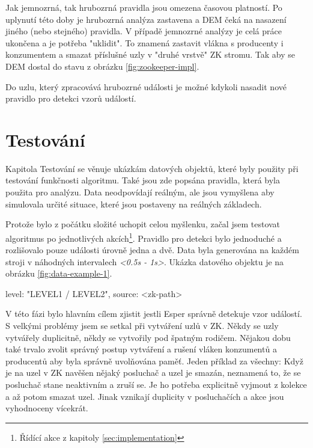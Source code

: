 \documentclass[
  digital, %
  table,   %
  nolof,     %
  nolot,     %
  oneside, %
  nocover,
  monochrome,
  12pt
]{fithesis3}
\begin{document}
Jak jemnozrná, tak hrubozrná pravidla jsou omezena časovou platností. Po uplynutí této doby je hrubozrná analýza zastavena a DEM čeká na nasazení jiného (nebo stejného) pravidla. V případě jemnozrné analýzy je celá práce ukončena a je potřeba "uklidit". To znamená zastavit vlákna s producenty i konzumentem a smazat příslušné uzly v "druhé vrstvě" ZK stromu. Tak aby se DEM dostal do stavu z obrázku \ref{fig:zookeeper-impl}.

Do uzlu, který zpracovává hrubozrné události je možné kdykoli nasadit nové pravidlo pro detekci vzorů událostí.

\section{Testování}

Kapitola Testování se věnuje ukázkám datových objektů, které byly použity při testování funkčnosti algoritmu. Také jsou zde popsána pravidla, která byla použita pro analýzu. Data neodpovídají reálným, ale jsou vymyšlena aby simulovala určité situace, které jsou postaveny na reálných základech.

Protože bylo z počátku složité uchopit celou myšlenku, začal jsem testovat algoritmus po jednotlivých akcích\footnote{Řídící akce z kapitoly \ref{sec:implementation}}. Pravidlo pro detekci bylo jednoduché a rozlišovalo pouze události úrovně jedna a dvě. Data byla generována na každém stroji v náhodných intervalech \textit{<0.5s - 1s>}. Ukázka datového objektu je na obrázku \ref{fig:data-example-1}.

\begin{center}
\begin{minipage}[H]{.5\linewidth}
	\begin{mylisting}
{
	level: "LEVEL1 / LEVEL2",
	source: <zk-path>
}
	\end{mylisting}
	\label{fig:data-example-1} 
\end{minipage}
\end{center}

V této fázi bylo hlavním cílem zjistit jestli Esper správně detekuje vzor událostí. S velkými problémy jsem se setkal při vytváření uzlů v ZK. Někdy se uzly vytvářely duplicitně, někdy se vytvořily pod špatným rodičem. Nějakou dobu také trvalo zvolit správný postup vytváření a rušení vláken konzumentů a producentů aby byla správně uvolňována paměť. Jeden příklad za všechny: Když je na uzel v ZK navěšen nějaký posluchač a uzel je smazán, neznamená to, že se posluchač stane neaktivním a zruší se. Je ho potřeba explicitně vyjmout z kolekce a až potom smazat uzel. Jinak vznikají duplicity v posluchačích a akce jsou vyhodnoceny vícekrát.
\end{document}
